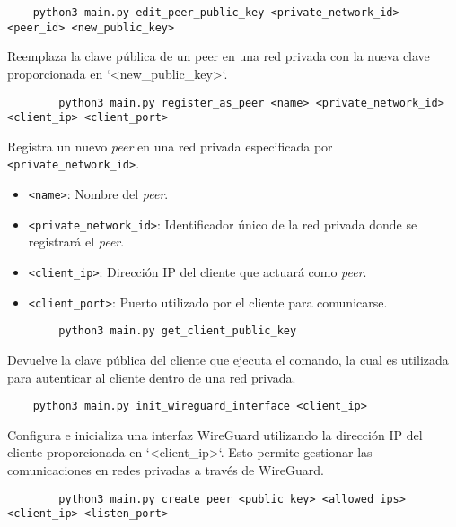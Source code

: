     \begin{verbatim}
    python3 main.py edit_peer_public_key <private_network_id> <peer_id> <new_public_key>
    \end{verbatim}
    Reemplaza la clave pública de un peer en una red privada con la nueva clave proporcionada en `<new\_public\_key>`.
     
    \begin{verbatim}
        python3 main.py register_as_peer <name> <private_network_id> <client_ip> <client_port>
    \end{verbatim}
    
    Registra un nuevo \textit{peer} en una red privada especificada por \texttt{<private\_network\_id>}.  
        \begin{itemize}
            \item \texttt{<name>}: Nombre del \textit{peer}.
            \item \texttt{<private\_network\_id>}: Identificador único de la red privada donde se registrará el \textit{peer}.
            \item \texttt{<client\_ip>}: Dirección IP del cliente que actuará como \textit{peer}.
            \item \texttt{<client\_port>}: Puerto utilizado por el cliente para comunicarse.
        \end{itemize}
        
    \begin{verbatim}
        python3 main.py get_client_public_key
    \end{verbatim}
    Devuelve la clave pública del cliente que ejecuta el comando, la cual es utilizada para autenticar al cliente dentro de una red privada.
    
    \begin{verbatim}
    python3 main.py init_wireguard_interface <client_ip>
    \end{verbatim}
    Configura e inicializa una interfaz WireGuard utilizando la dirección IP del cliente proporcionada en `<client\_ip>`. Esto permite gestionar las comunicaciones en redes privadas a través de WireGuard.
    
   
    
    \begin{verbatim}
        python3 main.py create_peer <public_key> <allowed_ips> <client_ip> <listen_port>
        \end{verbatim}
        
